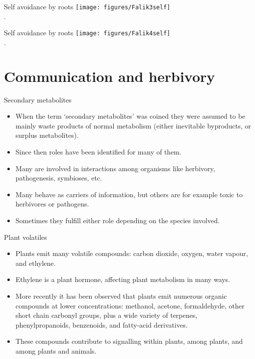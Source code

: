 \documentclass[10pt]{beamer}
\begin{document}
\begin{frame}{Self avoidance by roots}
    \centering
    \texttt{[image: figures/Falik3self]}\\
    {\small \autocite[from][]{Falik2003}.}
\end{frame}

\begin{frame}{Self avoidance by roots}
    \centering
    \texttt{[image: figures/Falik4self]}\\
    {\small \autocite[from][]{Falik2003}.}
\end{frame}

\section{Communication and herbivory}

\begin{frame}{Secondary metabolites}
    \begin{itemize}
        \item When the term `secondary metabolites' was coined they were assumed to be mainly waste products of normal metabolism (either inevitable byproducts, or surplus metabolites).
        \item Since then roles have been identified for many of them.
        \item Many are involved in interactions among organisms like herbivory, pathogenesis, symbioses, etc.
        \item Many behave as carriers of information, but others are for example toxic to herbivores or pathogens.
        \item Sometimes they fulfill either role depending on the species involved.
    \end{itemize}
\end{frame}

\begin{frame}{Plant volatiles}
    \begin{itemize}
        \item Plants emit many volatile compounds: carbon dioxide, oxygen, water vapour, and ethylene.
        \item Ethylene is a plant hormone, affecting plant metabolism in many ways.
        \item More recently it has been observed that plants emit numerous organic compounds at lower concentrations: methanol, acetone, formaldehyde, other short chain carbonyl groups, plus a wide variety of terpenes, phenylpropanoids, benzenoids, and fatty-acid derivatives.
        \item These compounds contribute to signalling within plants, among plants, and among plants and animals.
    \end{itemize}
\end{frame}
\end{document}
